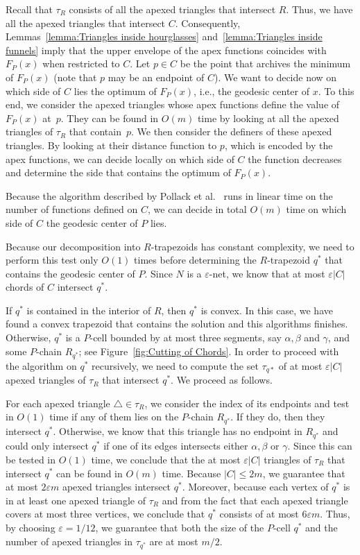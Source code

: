 \documentclass[a4paper,UKenglish]{lipics}
\newcommand{\F}[2]{\ensuremath{F_{\scriptscriptstyle #1}(#2)}}
\begin{document}
Recall that $\tau_R$ consists of all the apexed triangles that intersect $R$. 
Thus, we have all the apexed triangles that intersect $C$. Consequently, Lemmas~\ref{lemma:Triangles inside hourglasses} and~\ref{lemma:Triangles inside funnels} imply that the upper envelope of the apex functions coincides with $\F{P}{x}$ when restricted to $C$.
Let $p\in C$ be the point that archives the minimum of $\F{P}{x}$ (note that $p$ may be an endpoint of $C$). 
We want to decide now on which side of $C$ lies the optimum of $\F{P}{x}$, i.e., the geodesic center of $x$. 
To this end, we consider the apexed triangles whose apex functions define the value of $\F{P}{x}$ at~$p$. 
They can be found in $O(m)$ time by looking at all the apexed triangles of $\tau_R$ that contain~$p$. 
We then consider the definers of these apexed triangles. By looking at their distance function to $p$, which is encoded by the apex functions, we can decide locally on which side of $C$ the function decreases and determine the side that contains the optimum of $\F{P}{x}$.

Because the algorithm described by Pollack et al.~\cite[Section~3]{pollackComputingCenter} runs in linear time on the number of functions defined on $C$, we can decide in total $O(m)$ time on which side of $C$ the geodesic center of $P$ lies. 

Because our decomposition into $R$-trapezoids has constant complexity, we need to perform this test only $O(1)$ times before determining the $R$-trapezoid $q^*$ that contains the geodesic center of $P$. 
Since $N$ is a $\varepsilon$-net, we know that at most $\varepsilon |C|$ chords of $C$ intersect $q^*$.

If $q^*$ is contained in the interior of $R$, then $q^*$ is convex. In this case, we have found a convex trapezoid that contains the solution and this algorithms finishes. Otherwise, $q^*$ is a $P$-cell bounded by at most three segments, say $\alpha, \beta$ and $\gamma$, and some $P$-chain $R_{q^*}$; see Figure~\ref{fig:Cutting of Chords}. 
In order to proceed with the algorithm on  $q^*$ recursively, we need to compute the set $\tau_{q*}$ of at most $\varepsilon |C|$ apexed triangles of $\tau_R$ that intersect $q^*$. We proceed as follows.

For each apexed triangle $\triangle\in \tau_R$, we consider the index of its endpoints and test in $O(1)$ time if any of them lies on the $P$-chain $R_{q^*}$. If they do, then they intersect $q^*$. Otherwise, we know that this triangle has no endpoint in $R_{q^*}$ and could only intersect $q^*$ if one of its edges intersects either $\alpha, \beta$ or $\gamma$. Since this can be tested in $O(1)$ time, we conclude that the at most $\varepsilon |C|$ triangles of $\tau_R$ that intersect $q^*$ can be found in $O(m)$ time.
Because $|C| \leq 2m$, we guarantee that at most $2\varepsilon m$ apexed triangles intersect $q^*$. 
Moreover, because each vertex of $q^*$ is in at least one apexed triangle of $\tau_R$ and from the fact that each apexed triangle covers at most three vertices, we conclude that $q^*$ consists of at most $6 \varepsilon m$.
Thus, by choosing $\varepsilon = 1/12$, we guarantee that both the size of the $P$-cell $q^*$ and the number of apexed triangles in $\tau_{q^*}$ are at most $m/2$.
\end{document}
